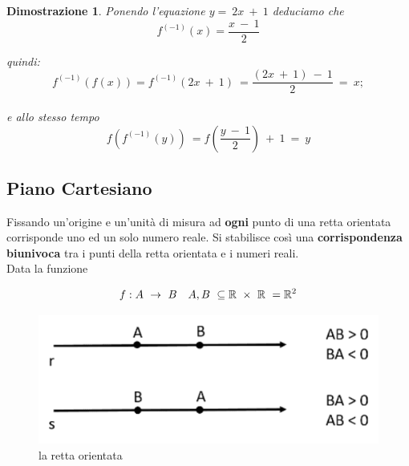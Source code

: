 \documentclass[12pt, a4paper]{article}
\theoremstyle{break}
\theoremstyle{lemma}
\theoremstyle{lemma}
\newtheorem{dimo}{Dimostrazione}
\theoremstyle{lemma}
\begin{document}
\begin{dimo}
Ponendo l'equazione $ y =\ 2x\ +\ 1$ deduciamo che\\

\begin{equation}
  f^{(-1)}(x) = \frac{x\ -\ 1}{2}
\end{equation}

\vspace{1.5mm}
quindi:\\
\begin{equation}
  f^{(-1)}(f(x))= f^{(-1)}(2x\ +\ 1)\ = \frac{(2x\ +\ 1)\ -\ 1}{2}\ =\ x;
\end{equation}
\vspace{1.5mm}\\
e allo stesso tempo\\

\vspace{1.5mm}
\begin{equation}
f(f^{(-1)}(y))\ = f(\frac{y\ -\ 1}{2})\ +\ 1\ =\ y
\end{equation}
\end{dimo}

\subsection{Piano Cartesiano}
Fissando un'origine e un'unità di misura ad \textbf{ogni} punto di una retta orientata corrisponde uno ed un solo numero reale.
Si stabilisce così una \textbf{corrispondenza biunivoca} tra i punti della retta orientata e i numeri reali.\\
Data la funzione
\vspace{1.5mm}

\begin{equation}
  f: A\ \rightarrow\ B \quad A,B\ \subseteq \mathbb{R}\ \times\ \mathbb{R}\ = \mathbb{R}^2\\
\end{equation}

\begin{figure}[ht]
  \center
  \includegraphics[scale=0.25]{rettaorientata}
  \caption{la retta orientata}
  \label{fig:retta_orientata}
\end{figure}
\end{document}
